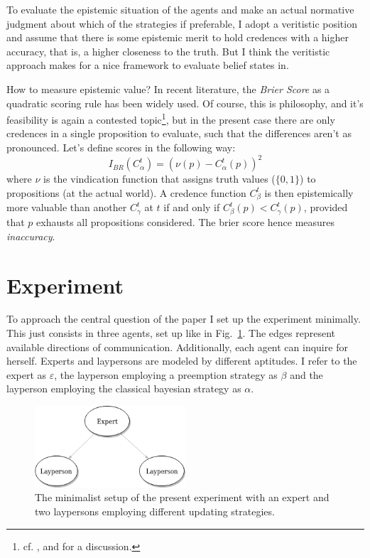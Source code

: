 \documentclass[11pt, a4paper]{scrartcl}
\renewcommand{\i}[1]{\emph{#1}}
\renewcommand{\a}{\alpha}
\begin{document}
To evaluate the epistemic situation of the agents and make an actual normative judgment about which of the strategies if preferable, I adopt a veritistic position and assume that there is some epistemic merit to hold credences with a higher accuracy, that is, a higher closeness to the truth. But I think the veritistic approach makes for a nice framework to evaluate belief states in. 

How to measure epistemic value? In recent literature, the \i{Brier Score} as a quadratic scoring rule has been widely used. Of course, this is philosophy, and it's feasibility is again a contested topic\footnote{cf. \textcite{Joyce1998-JOYANV}, \textcite{Maher2002-MAHJAF} and \textcite{Fallis2016} for a discussion.}, but in the present case there are only credences in a single proposition to evaluate, such that the differences aren't as pronounced. Let's define scores in the following way:
\begin{equation*}
    I_{BR}(C^t_\a) = {(\nu(p) - C^t_\a(p))}^2
\end{equation*}
where $\nu$ is the vindication function that assigns truth values ($\{0,1\}$) to propositions (at the actual world).
A credence function $C^t_\beta$ is then epistemically more valuable than another $C^t_\gamma$ at $t$ if and only if $C^t_\beta(p) < C^t_\gamma(p)$, provided that $p$ exhausts all propositions considered. The brier score hence measures \i{inaccuracy}.

\section{Experiment}

To approach the central question of the paper I set up the experiment minimally. This just consists in three agents, set up like in Fig.~\ref{fig:el}. The edges represent available directions of communication. Additionally, each agent can inquire for herself. Experts and laypersons are modeled by different aptitudes. I refer to the expert as $\varepsilon$, the layperson employing a preemption strategy as $\beta$ and the layperson employing the classical bayesian strategy as $\a$. 

\begin{figure}[ht]
	\centering
    \includegraphics[width=0.5\textwidth]{Expert_Layperson.png}
	\caption{The minimalist setup of the present experiment with an expert and two laypersons employing different updating strategies.\label{fig:el}}
\end{figure}
\end{document}
